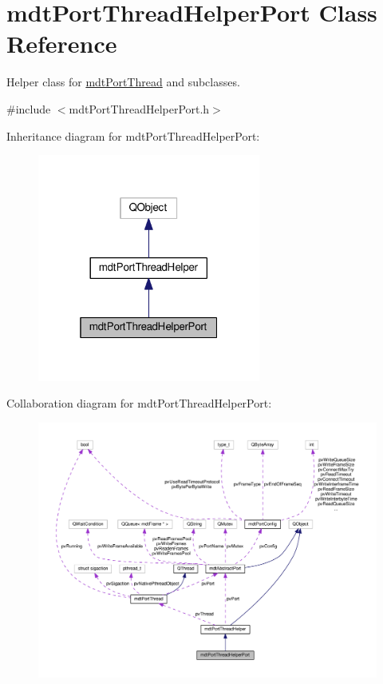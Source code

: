 \hypertarget{classmdt_port_thread_helper_port}{\section{mdt\-Port\-Thread\-Helper\-Port Class Reference}
\label{classmdt_port_thread_helper_port}
}


Helper class for \hyperlink{classmdt_port_thread}{mdt\-Port\-Thread} and subclasses.  




{\ttfamily \#include $<$mdt\-Port\-Thread\-Helper\-Port.\-h$>$}



Inheritance diagram for mdt\-Port\-Thread\-Helper\-Port\-:\nopagebreak
\begin{figure}[H]
\begin{center}
\leavevmode
\includegraphics[width=208pt]{classmdt_port_thread_helper_port__inherit__graph}
\end{center}
\end{figure}


Collaboration diagram for mdt\-Port\-Thread\-Helper\-Port\-:\nopagebreak
\begin{figure}[H]
\begin{center}
\leavevmode
\includegraphics[width=350pt]{classmdt_port_thread_helper_port__coll__graph}
\end{center}
\end{figure}
